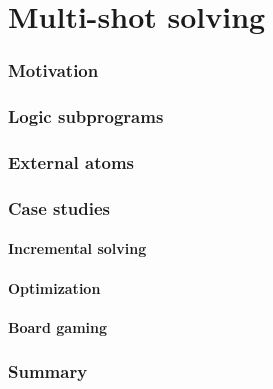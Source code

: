 \part{Multi-shot solving}
\section{Motivation}

\section{Logic subprograms}


\section{External atoms}


\section{Case studies}
\subsection{Incremental solving}

\subsection{Optimization}

\subsection{Board gaming}

\section{Summary}

%
